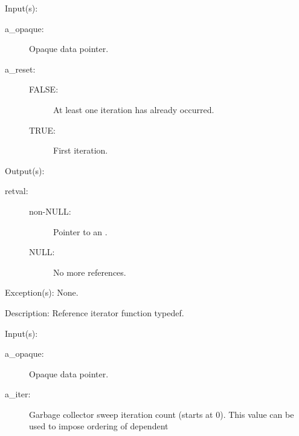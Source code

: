 \begin{capi}
\label{cw_nxo_instance_ref_iter_t}
	\begin{capilist}
	\item[Input(s): ]
		\begin{description}\item[]
		\item[a\_opaque: ]
			Opaque data pointer.
		\item[a\_reset: ]
			\begin{description}\item[]
			\item[FALSE: ]
				At least one iteration has already occurred.
			\item[TRUE: ]
				First iteration.
			\end{description}
		\end{description}
	\item[Output(s): ]
		\begin{description}\item[]
		\item[retval: ]
			\begin{description}\item[]
			\item[non-NULL: ]
				Pointer to an .
			\item[NULL: ]
				No more references.
			\end{description}
		\end{description}
	\item[Exception(s): ] None.
	\item[Description: ]
		Reference iterator function typedef.
	\end{capilist}
\label{cw_nxo_instance_delete_t}
	\begin{capilist}
	\item[Input(s): ]
		\begin{description}\item[]
		\item[a\_opaque: ]
			Opaque data pointer.
		\item[a\_iter: ]
			Garbage collector sweep iteration count (starts at 0).
			This value can be used to impose ordering of dependent

\end{description}
\end{capilist}
\end{capi}
